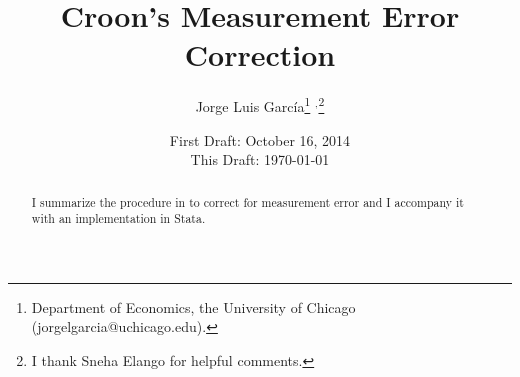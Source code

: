 



\title{Croon's Measurement Error Correction}
\author{Jorge Luis Garc\'{i}a\thanks{Department of Economics, the University of Chicago (jorgelgarcia@uchicago.edu).} $^{,}$\thanks{I thank Sneha Elango for helpful comments.}}
\date{First Draft: October 16, 2014 \\ This Draft: \today}
\maketitle

\begin{abstract}
\noindent I summarize the procedure in \citet{croon2002using} to correct for measurement error and I accompany it with an implementation in Stata. 
\end{abstract}





\clearpage

